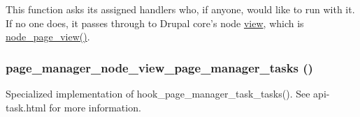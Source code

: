 This function asks its assigned handlers who, if anyone, would like to run with it. If no one does, it passes through to Drupal core's node \hyperlink{classview}{view}, which is \hyperlink{node_8module_ae409793704d24e41aee23db5d7933231}{node\_\-page\_\-view()}. \hypertarget{node__view_8inc_a981d1e2a2df349abcc15a7854063d01a}{
\subsubsection[{page\_\-manager\_\-node\_\-view\_\-page\_\-manager\_\-tasks}]{\setlength{\rightskip}{0pt plus 5cm}page\_\-manager\_\-node\_\-view\_\-page\_\-manager\_\-tasks ()}}
\label{node__view_8inc_a981d1e2a2df349abcc15a7854063d01a}
Specialized implementation of hook\_\-page\_\-manager\_\-task\_\-tasks(). See api-\/task.html for more information. 